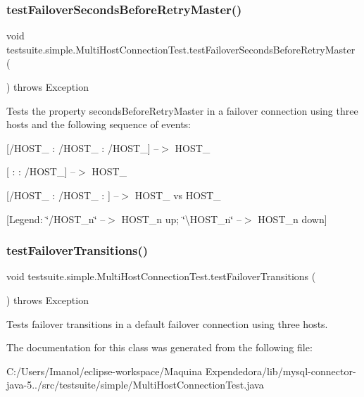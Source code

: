 \subsubsection{\texorpdfstring{test\+Failover\+Seconds\+Before\+Retry\+Master()}{testFailoverSecondsBeforeRetryMaster()}}
{\footnotesize\ttfamily void testsuite.\+simple.\+Multi\+Host\+Connection\+Test.\+test\+Failover\+Seconds\+Before\+Retry\+Master (\begin{DoxyParamCaption}{ }\end{DoxyParamCaption}) throws Exception}

Tests the property \textquotesingle{}seconds\+Before\+Retry\+Master\textquotesingle{} in a failover connection using three hosts and the following sequence of events\+:
\begin{DoxyItemize}
\item \mbox{[}/\+H\+O\+S\+T\+\_ \+: /\+H\+O\+S\+T\+\_ \+: /\+H\+O\+S\+T\+\_\mbox{]} --$>$ H\+O\+S\+T\+\_
\item \mbox{[} \+:  \+: /\+H\+O\+S\+T\+\_\mbox{]} --$>$ H\+O\+S\+T\+\_
\item \mbox{[}/\+H\+O\+S\+T\+\_ \+: /\+H\+O\+S\+T\+\_ \+: \mbox{]} --$>$ H\+O\+S\+T\+\_ vs H\+O\+S\+T\+\_
\end{DoxyItemize}

\mbox{[}Legend\+: \char`\"{}/\+H\+O\+S\+T\+\_\+n\char`\"{} --$>$ H\+O\+S\+T\+\_\+n up; \char`\"{}\textbackslash{}\+H\+O\+S\+T\+\_\+n\char`\"{} --$>$ H\+O\+S\+T\+\_\+n down\mbox{]} \mbox{\label{classtestsuite_1_1simple_1_1_multi_host_connection_test_ac73ab69db61b63a684b6d229fb83e97b}} 
\subsubsection{\texorpdfstring{test\+Failover\+Transitions()}{testFailoverTransitions()}}
{\footnotesize\ttfamily void testsuite.\+simple.\+Multi\+Host\+Connection\+Test.\+test\+Failover\+Transitions (\begin{DoxyParamCaption}{ }\end{DoxyParamCaption}) throws Exception}

Tests failover transitions in a default failover connection using three hosts. 

The documentation for this class was generated from the following file\+:\begin{DoxyCompactItemize}
\item 
C\+:/\+Users/\+Imanol/eclipse-\/workspace/\+Maquina Expendedora/lib/mysql-\/connector-\/java-\/5../src/testsuite/simple/Multi\+Host\+Connection\+Test.\+java\end{DoxyCompactItemize}
